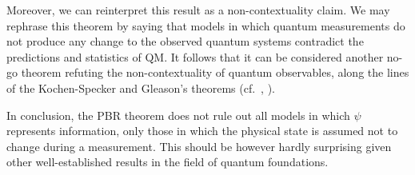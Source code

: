 \documentclass[aps,twocolumn,showpacs,preprintnumbers]{revtex4}
\begin{document}
	Moreover, we can reinterpret this result as a non-contextuality claim. We may rephrase this theorem by saying that models in which quantum measurements do not produce any change to the observed quantum systems contradict the predictions and statistics of QM. It follows that it can be considered another no-go theorem refuting the non-contextuality of quantum observables, along the lines of the Kochen-Specker and Gleason's theorems (cf.\ \cite{Kochen:1967}, \cite{Gleason:1957}).
	
	In conclusion, the PBR theorem does not rule out all models in which $\psi$ represents information, only those in which the physical state is assumed not to change during a measurement. This should be however hardly surprising given other well-established results in the field of quantum foundations. 
	
	
	
	
	
	
\end{document}
